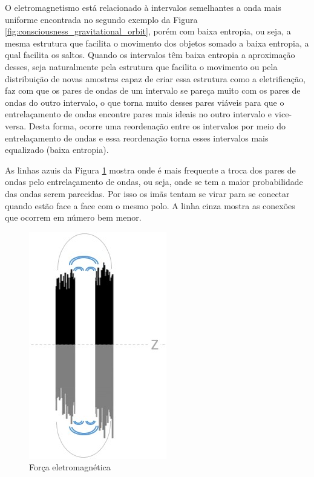 O eletromagnetismo está relacionado à intervalos semelhantes a onda mais uniforme encontrada no segundo exemplo da Figura \ref{fig:consciousness_gravitational_orbit}, porém com baixa entropia, ou seja, a mesma estrutura que facilita o movimento dos objetos somado a baixa entropia, a qual facilita os saltos. Quando os intervalos têm baixa entropia a aproximação desses, seja naturalmente pela estrutura que facilita o movimento ou pela distribuição de novas amostras capaz de criar essa estrutura como a eletrificação, faz com que os pares de ondas de um intervalo se pareça muito com os pares de ondas do outro intervalo, o que torna muito desses pares viáveis para que o entrelaçamento de ondas encontre pares mais ideais no outro intervalo e vice-versa. Desta forma, ocorre uma reordenação entre os intervalos por meio do entrelaçamento de ondas e essa reordenação torna esses intervalos mais equalizado (baixa entropia).

As linhas azuis da Figura \ref{fig:consciousness_electromaagnetic_force} mostra onde é mais frequente a troca dos pares de ondas pelo entrelaçamento de ondas, ou seja, onde se tem a maior probabilidade das ondas serem parecidas. Por isso os imãs tentam se virar para se conectar quando estão face a face com o mesmo polo. A linha cinza mostra as conexões que ocorrem em número bem menor.
	\begin{figure}[H]
	\caption{Força eletromagnética}
	\label{fig:consciousness_electromaagnetic_force}
	\centering
	\includegraphics[scale=.7]{sections/images/consciousness_electromaagnetic_force.jpg}
	\end{figure}

